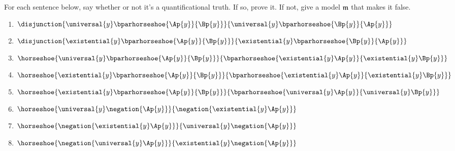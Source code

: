 For each sentence below, say whether or not it's a quantificational truth. 
If so, prove it. 
If not, give a model $\mathfrak{m}$ that makes it false.
\begin{multicols}{2}
\begin{enumerate}
\item {$\disjunction{\universal{\variable{y}}\bparhorseshoe{\Ap{\variable{y}}}{\Bp{\variable{y}}}}{\universal{\variable{y}}\bparhorseshoe{\Bp{\variable{y}}}{\Ap{\variable{y}}}}$}
\item {$\disjunction{\existential{\variable{y}}\bparhorseshoe{\Ap{\variable{y}}}{\Bp{\variable{y}}}}{\existential{\variable{y}}\bparhorseshoe{\Bp{\variable{y}}}{\Ap{\variable{y}}}}$}
\item {$\horseshoe{\universal{\variable{y}}\bparhorseshoe{\Ap{\variable{y}}}{\Bp{\variable{y}}}}{\bparhorseshoe{\existential{\variable{y}}\Ap{\variable{y}}}{\existential{\variable{y}}\Bp{\variable{y}}}}$}
\item {$\horseshoe{\existential{\variable{y}}\bparhorseshoe{\Ap{\variable{y}}}{\Bp{\variable{y}}}}{\bparhorseshoe{\existential{\variable{y}}\Ap{\variable{y}}}{\existential{\variable{y}}\Bp{\variable{y}}}}$}
\item {$\horseshoe{\existential{\variable{y}}\bparhorseshoe{\Ap{\variable{y}}}{\Bp{\variable{y}}}}{\bparhorseshoe{\universal{\variable{y}}\Ap{\variable{y}}}{\universal{\variable{y}}\Bp{\variable{y}}}}$}
\item {$\horseshoe{\universal{\variable{y}}\negation{\Ap{\variable{y}}}}{\negation{\existential{\variable{y}}\Ap{\variable{y}}}}$}
\item {$\horseshoe{\negation{\existential{\variable{y}}\Ap{\variable{y}}}}{\universal{\variable{y}}\negation{\Ap{\variable{y}}}}$}
\item {$\horseshoe{\negation{\universal{\variable{y}}\Ap{\variable{y}}}}{\existential{\variable{y}}\negation{\Ap{\variable{y}}}}$}
\end{enumerate}
\end{multicols}
